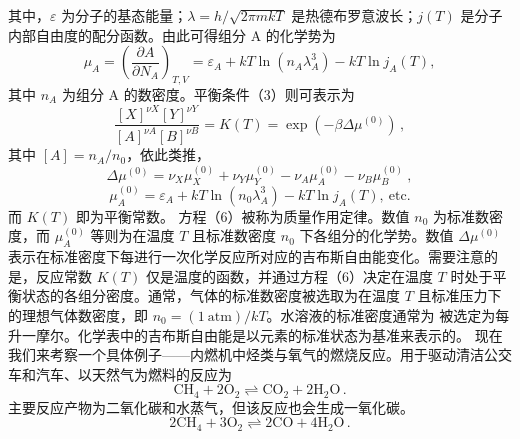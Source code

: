 其中，\(\varepsilon\) 为分子的基态能量；\(\lambda = h/\sqrt{2\pi mkT}\) 是热德布罗意波长；\(j(T)\) 是分子内部自由度的配分函数。由此可得组分 A 的化学势为
\begin{equation}\tag{6.6.5}\label{eq:6.6.5}
\mu _ { A } = \left( \frac { \partial A } { \partial N _ { A } } \right) _ { T , V } = \varepsilon _ { A } + k T \ln \left( n _ { A } \lambda _ { A } ^{3} \right) - k T \ln j _ { A } ( T ) ,
\end{equation}
其中 \(n_{A}\) 为组分 A 的数密度。平衡条件（3）则可表示为
\begin{equation}\tag{6.6.6}\label{eq:6.6.6}
\frac { [ X ] ^{\nu X} [ Y ] ^{\nu Y} } { [ A ] ^{\nu A} [ B ] ^{\nu B} } = K ( T ) = \exp \left( - \beta \Delta \mu ^{( 0 )} \right) \, ,
\end{equation}
其中 \([A] = n_{A}/n_{0}\)，依此类推，
\begin{equation}\tag{6.6.7}\label{eq:6.6.7}
\Delta \mu ^{( 0 )} = \nu _ { X } \mu _ { X } ^{( 0 )} + \nu _ { Y } \mu _ { Y } ^{( 0 )} - \nu _ { A } \mu _ { A } ^{( 0 )} - \nu _ { B } \mu _ { B } ^{( 0 )} \ ,
\end{equation}
\begin{equation}\tag{6.6.8}\label{eq:6.6.8}
\mu _ { A } ^{( 0 )} = \varepsilon _ { A } + k T \ln \left( n _ { 0 } \lambda _ { A } ^{3} \right) - k T \ln j _ { A } ( T ) , \mathrm { ~ e t c . }
\end{equation}
而 \(K(T)\) 即为平衡常数。
方程（6）被称为质量作用定律。数值 \(n_{0}\) 为标准数密度，而 \(\mu_{A}^{(0)}\) 等则为在温度 \(T\) 且标准数密度 \(n_{0}\) 下各组分的化学势。数值 \(\Delta\mu^{(0)}\) 表示在标准密度下每进行一次化学反应所对应的吉布斯自由能变化。需要注意的是，反应常数 \(K(T)\) 仅是温度的函数，并通过方程（6）决定在温度 \(T\) 时处于平衡状态的各组分密度。通常，气体的标准数密度被选取为在温度 \(T\) 且标准压力下的理想气体数密度，即 \(n_{0}=(1\ \mathrm{atm})/kT\)。水溶液的标准密度通常为
被选定为每升一摩尔。化学表中的吉布斯自由能是以元素的标准状态为基准来表示的。
现在我们来考察一个具体例子——内燃机中烃类与氧气的燃烧反应。用于驱动清洁公交车和汽车、以天然气为燃料的反应为
\begin{equation}\tag{6.6.9}\label{eq:6.6.9}
\mathrm { C H } _ { 4 } + 2 \mathrm { O } _ { 2 } \rightleftharpoons \mathrm { C O } _ { 2 } + 2 \mathrm { H } _ { 2 } \mathrm { O } \, .
\end{equation}
主要反应产物为二氧化碳和水蒸气，但该反应也会生成一氧化碳。
\begin{equation}\tag{6.6.10}\label{eq:6.6.10}
2 \mathrm { C H } _ { 4 } + 3 \mathrm { O } _ { 2 } \rightleftharpoons 2 \mathrm { C O } + 4 \mathrm { H } _ { 2 } \mathrm { O } \, .
\end{equation}
